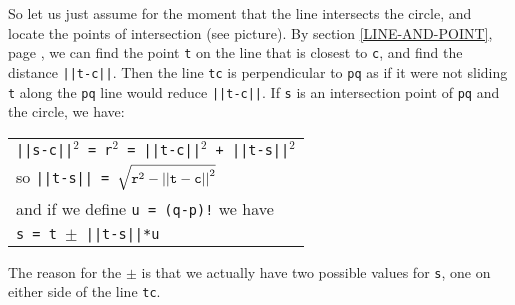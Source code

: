 \documentclass[12pt]{article}
\begin{document}
\begin{minipage}{\textwidth}\raggedright
\label{INTERSECTION-PICTURE}
\begin{wrapfigure}{r}{0.5\textwidth}
\end{wrapfigure}
So let us just assume for the moment that the line intersects
the circle, and locate the points of intersection (see picture).
By section \ref{LINE-AND-POINT}, page \pageref{LINE-AND-POINT},
we can find the point {\tt t} on the line that is closest to
{\tt c}, and find the distance {\tt ||t-c||}.  Then the line {\tt tc} is
perpendicular to {\tt pq} as if it were not sliding {\tt t}
along the {\tt pq} line would reduce {\tt ||t-c||}.
If {\tt s} is an intersection point of {\tt pq} and the circle, we have: \\
\hspace*{0.2in}\begin{tabular}{@{}l}
    {\tt ||s-c||$^2$ = r$^2$ = ||t-c||$^2$ + ||t-s||$^2$} \\
    so {\tt ||t-s|| = $\sqrt{{\tt r}^2 - {\tt ||t-c||}^2}$} \\
    and if we define {\tt u = (q-p)!} we have \\
    {\tt s = t $\pm$ ||t-s||*u} \\
    \end{tabular}
\end{minipage}

The reason for the $\pm$ is that we actually have two possible
values for {\tt s}, one on either side of the line {\tt tc}.
\end{document}
